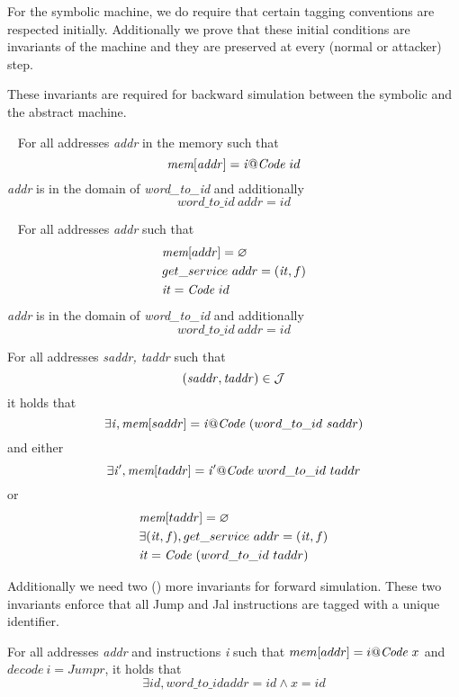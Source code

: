 For the symbolic machine, we do require that certain tagging
conventions are respected initially. Additionally we prove that
these initial conditions are invariants of the machine and they
are preserved at every (normal or attacker) step.

These invariants are required for backward simulation between
the symbolic and the abstract machine.

\begin{definition}\label{instructions_tagged}
  ~ For all addresses \textit{addr} in the memory such that
  $$\textit{mem}[\mathit{addr}] = \mathit{i}@\textit{Code}~id$$ \textit{addr}
  is in the domain of \emph{word\_to\_id} and additionally
  $$word\_to\_id ~\mathit{addr} = \mathit{id}$$
\end{definition}

\begin{definition}\label{entry_tagged}
  ~ For all addresses \textit{addr} such that 
  \begin{align*}
  & \textit{mem}[addr] = \varnothing\\
  & get\_service~addr = (\mathit{it},f)\\
  & \mathit{it} = \textit{Code}~id
  \end{align*}
  \textit{addr} is in the domain of \emph{word\_to\_id} and additionally
  $$word\_to\_id ~\mathit{addr} = \mathit{id}$$
\end{definition}

\begin{definition}\label{valid_jmp_tagged}
  For all addresses \textit{saddr, taddr} such that
  $$(\mathit{saddr},\mathit{taddr}) \in \mathcal{J}$$ it holds that
  $$\exists \mathit{i}, \textit{mem}[saddr] = \mathit{i}@\textit{Code}~(word\_to\_id~saddr) $$
  and either $$\exists \mathit{i'}, \textit{mem}[taddr]
  =\mathit{i'}@\textit{Code}~word\_to\_id~taddr$$ or
  \begin{align*}
  & \textit{mem}[taddr] = \varnothing\\ 
  & \exists (\mathit{it},f), get\_service~addr = (\mathit{it},f)\\
  & \mathit{it} = \textit{Code}~(word\_to\_id~taddr)
  \end{align*}
\end{definition}

Additionally we need two () more invariants for forward
simulation. These two invariants enforce that all Jump and Jal instructions
are tagged with a unique identifier.

\begin{definition}\label{jumps_tagged}
  For all addresses \textit{addr} and instructions \textit{i} such
  that $mem[addr]=i@\textit{Code}~x$ and $decode~i = Jump r$, it holds that
  $$\exists id, word\_to\_id addr = id \land x = id$$
\end{definition}

